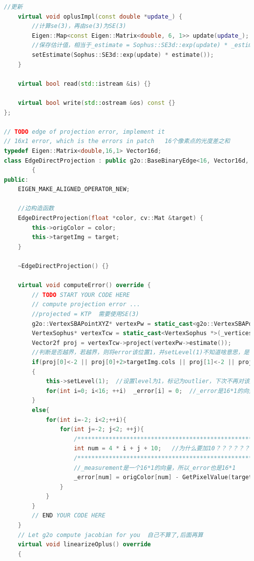 \documentclass[40pt,a4paper，UTF8]{ctexart}
\numberwithin{equation}{section}
\begin{document}
\begin{lstlisting}[language=C++, caption=Direct\_BA.cpp]
    //更新
    virtual void oplusImpl(const double *update_) {
        //计算se(3)，再由se(3)为SE(3)
        Eigen::Map<const Eigen::Matrix<double, 6, 1>> update(update_);
        //保存估计值，相当于_estimate = Sophus::SE3d::exp(update) * _estimate；
        setEstimate(Sophus::SE3d::exp(update) * estimate());
    }

    virtual bool read(std::istream &is) {}

    virtual bool write(std::ostream &os) const {}
};

// TODO edge of projection error, implement it
// 16x1 error, which is the errors in patch   16个像素点的光度差之和
typedef Eigen::Matrix<double,16,1> Vector16d;
class EdgeDirectProjection : public g2o::BaseBinaryEdge<16, Vector16d, g2o::VertexSBAPointXYZ, VertexSophus>  //一个是SBA的XYZ自带边，一个是自定义的边
        {
public:
    EIGEN_MAKE_ALIGNED_OPERATOR_NEW;

    //边构造函数
    EdgeDirectProjection(float *color, cv::Mat &target) {
        this->origColor = color;
        this->targetImg = target;
    }

    ~EdgeDirectProjection() {}

    virtual void computeError() override {
        // TODO START YOUR CODE HERE
        // compute projection error ...
        //projected = KTP  需要使用SE(3)
        g2o::VertexSBAPointXYZ* vertexPw = static_cast<g2o::VertexSBAPointXYZ *>(_vertices[0]);
        VertexSophus* vertexTcw = static_cast<VertexSophus *>(_vertices[1]);
        Vector2f proj = vertexTcw->project(vertexPw->estimate());
        //判断是否越界，若越界，则将error该位置1，并setLevel(1)不知道啥意思，是记录好坏的吗？
        if(proj[0]<-2 || proj[0]+2>targetImg.cols || proj[1]<-2 || proj[1]+2>targetImg.rows)
        {
            this->setLevel(1);  //设置level为1，标记为outlier，下次不再对该边进行优化
            for(int i=0; i<16; ++i)  _error[i] = 0;  //_error是16*1的向量
        }
        else{
            for(int i=-2; i<2;++i){
                for(int j=-2; j<2; ++j){
                    /*******************************************************/
                    int num = 4 * i + j + 10;   //为什么要加10？？？？？？？？？？？？？？？？？？？？？？？
                    /*******************************************************/
                    //_measurement是一个16*1的向量，所以_error也是16*1
                    _error[num] = origColor[num] - GetPixelValue(targetImg, proj[0]+i, proj[1]+j);
                }
            }
        }
        // END YOUR CODE HERE
    }
    // Let g2o compute jacobian for you  自己不算了,后面再算
    virtual void linearizeOplus() override
    {


\end{lstlisting}
\end{document}
